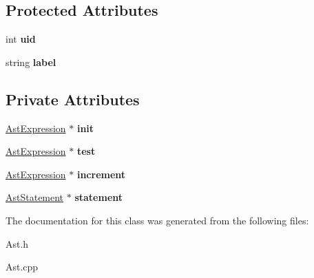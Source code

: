 \subsection*{Protected Attributes}
\begin{DoxyCompactItemize}
\item 
\hypertarget{classAST_a847b778f1c3dd5a19de32de432ee6e15}{int {\bfseries uid}}\label{classAST_a847b778f1c3dd5a19de32de432ee6e15}

\item 
\hypertarget{classAST_ab2e239ccc0688d2341724432ff5a1a31}{string {\bfseries label}}\label{classAST_ab2e239ccc0688d2341724432ff5a1a31}

\end{DoxyCompactItemize}
\subsection*{Private Attributes}
\begin{DoxyCompactItemize}
\item 
\hypertarget{classAstFor_aaebd550fca64ada15ccd61f784a7b8e3}{\hyperlink{classAstExpression}{Ast\-Expression} $\ast$ {\bfseries init}}\label{classAstFor_aaebd550fca64ada15ccd61f784a7b8e3}

\item 
\hypertarget{classAstFor_abc2bfc9976f254069d7f80db22630ada}{\hyperlink{classAstExpression}{Ast\-Expression} $\ast$ {\bfseries test}}\label{classAstFor_abc2bfc9976f254069d7f80db22630ada}

\item 
\hypertarget{classAstFor_a4638ba73c928d6144972acc06b8226f8}{\hyperlink{classAstExpression}{Ast\-Expression} $\ast$ {\bfseries increment}}\label{classAstFor_a4638ba73c928d6144972acc06b8226f8}

\item 
\hypertarget{classAstFor_a9d7943f531d80a986672c55100da1a0f}{\hyperlink{classAstStatement}{Ast\-Statement} $\ast$ {\bfseries statement}}\label{classAstFor_a9d7943f531d80a986672c55100da1a0f}

\end{DoxyCompactItemize}


The documentation for this class was generated from the following files\-:\begin{DoxyCompactItemize}
\item 
Ast.\-h\item 
Ast.\-cpp\end{DoxyCompactItemize}
